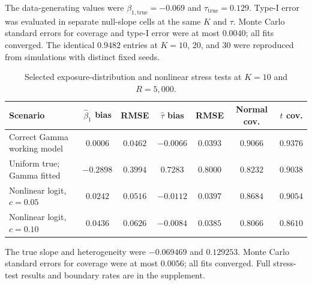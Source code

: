 \documentclass[journal=rsm]{CUP-JNL-DTM}%
\theoremstyle{definition}
\numberwithin{equation}{section}
\begin{document}
\begin{table}[htbp]
\centering
\caption{Point and interval performance across numbers of independent study blocks under the empirical slope and heterogeneity. Each setting used 25 resampled empirical support-and-covariance templates and $R=5{,}000$ replicates.}
\label{tab:simK}
\scriptsize
\setlength{\tabcolsep}{2.6pt}
\par\smallskip
{\footnotesize The data-generating values were $\beta_{1,\mathrm{true}}=-0.069$ and $\tau_{\mathrm{true}}=0.129$. Type-I error was evaluated in separate null-slope cells at the same $K$ and $\tau$. Monte Carlo standard errors for coverage and type-I error were at most $0.0040$; all fits converged. The identical $0.9482$ entries at $K=10$, 20, and 30 were reproduced from simulations with distinct fixed seeds.}
\end{table}

\begin{table}[htbp]
\centering
\caption{Selected exposure-distribution and nonlinear stress tests at $K=10$ and $R=5{,}000$.}
\label{tab:simstress}
\small
\setlength{\tabcolsep}{3.5pt}
\begin{tabular}{lcccccc}
\toprule
Scenario & $\hat\beta_1$ bias & RMSE & $\hat\tau$ bias & RMSE & Normal cov. & $t$ cov. \\
\midrule
Correct Gamma working model & $0.0006$ & $0.0462$ & $-0.0066$ & $0.0393$ & $0.9066$ & $0.9376$ \\
Uniform true; Gamma fitted & $-0.2898$ & $0.3994$ & $0.7283$ & $0.8000$ & $0.8232$ & $0.9038$ \\
Nonlinear logit, $c=0.05$ & $0.0242$ & $0.0516$ & $-0.0112$ & $0.0397$ & $0.8684$ & $0.9054$ \\
Nonlinear logit, $c=0.10$ & $0.0436$ & $0.0626$ & $-0.0084$ & $0.0385$ & $0.8066$ & $0.8610$ \\
\bottomrule
\end{tabular}
\par\smallskip
{\footnotesize The true slope and heterogeneity were $-0.069469$ and $0.129253$. Monte Carlo standard errors for coverage were at most $0.0056$; all fits converged. Full stress-test results and boundary rates are in the supplement.}
\end{table}
\end{document}
